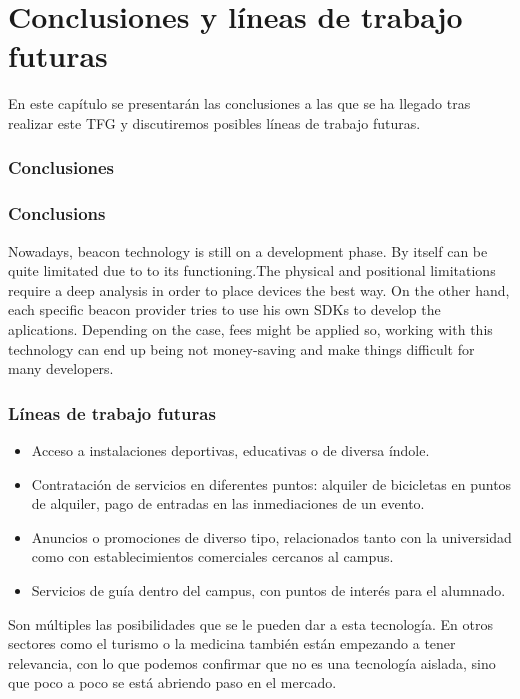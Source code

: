 %
%
%

\chapter{Conclusiones y líneas de trabajo futuras} \label{chap:Conclusiones} 

En este capítulo se presentarán las conclusiones a las que se ha llegado tras realizar este TFG y discutiremos posibles líneas de trabajo futuras.

\subsection{Conclusiones}


\subsection{Conclusions}

Nowadays, beacon technology is still on a development phase. By itself can be quite limitated due to to its functioning.The physical and positional limitations require a deep analysis in order to place devices the best way. On the other hand, each specific beacon provider tries to use his own SDKs to develop the aplications. Depending on the case, fees might be applied so, working with this technology can end up being not money-saving and make things difficult for many developers.


\subsection{Líneas de trabajo futuras}



\begin{itemize}
\item Acceso a instalaciones deportivas, educativas o de diversa índole.
\item Contratación de servicios en diferentes puntos: alquiler de bicicletas en puntos de alquiler, pago de entradas en las inmediaciones de un evento.
\item Anuncios o promociones de diverso tipo, relacionados tanto con la universidad como con establecimientos comerciales cercanos al campus.
\item Servicios de guía dentro del campus, con puntos de interés para el alumnado.
\end{itemize}


Son múltiples las posibilidades que se le pueden dar a esta tecnología. En otros sectores como el turismo o la medicina también están empezando a tener relevancia, con lo que podemos confirmar que no es una tecnología aislada, sino que poco a poco se está abriendo paso en el mercado.










